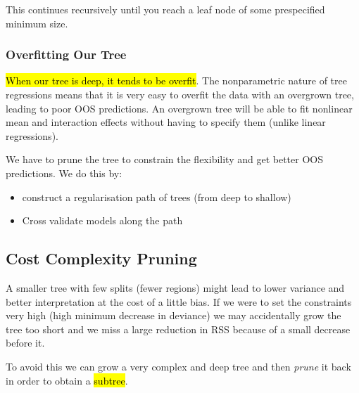 \documentclass[11pt]{article}
\begin{document}
This continues recursively until you reach a leaf node of some prespecified minimum size.

\subsubsection{Overfitting Our Tree}

\hl{When our tree is deep, it tends to be overfit}. The nonparametric nature of tree regressions means that it is very easy to overfit the data with an overgrown tree, leading to poor OOS predictions. An overgrown tree will be able to fit nonlinear mean and interaction effects without having to specify them (unlike linear regressions).

We have to prune the tree to constrain the flexibility and get better OOS predictions. We do this by:
\begin{itemize}
    \item construct a regularisation path of trees (from deep to shallow)
    \item Cross validate models along the path
\end{itemize}

\subsection{Cost Complexity Pruning}

A smaller tree with few splits (fewer regions) might lead to lower variance and better interpretation at the cost of a little bias. If we were to set the constraints very high (high minimum decrease in deviance) we may accidentally grow the tree too short and we miss a large reduction in RSS because of a small decrease before it. 

To avoid this we can grow a very complex and deep tree and then \textit{prune} it back in order to obtain a \hl{subtree}.
\end{document}

